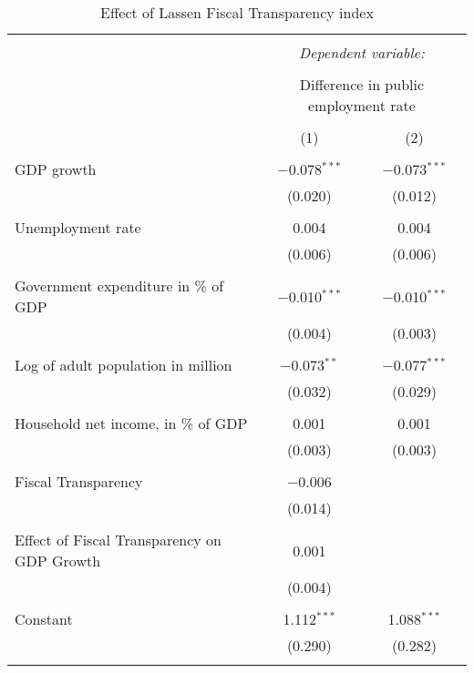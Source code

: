 
\begin{table}[!htbp] \centering 
  \caption{Effect of Lassen Fiscal Transparency index} 
  \label{} 
\begin{tabular}{@{\extracolsep{5pt}}lcc} 
\\[-1.8ex]\hline 
\hline \\[-1.8ex] 
 & \multicolumn{2}{c}{\textit{Dependent variable:}} \\ 
\cline{2-3} 
\\[-1.8ex] & \multicolumn{2}{c}{Difference in public employment rate} \\ 
\\[-1.8ex] & (1) & (2)\\ 
\hline \\[-1.8ex] 
 GDP growth & $-$0.078$^{***}$ & $-$0.073$^{***}$ \\ 
  & (0.020) & (0.012) \\ 
  & & \\ 
 Unemployment rate & 0.004 & 0.004 \\ 
  & (0.006) & (0.006) \\ 
  & & \\ 
 Government expenditure in \% of GDP & $-$0.010$^{***}$ & $-$0.010$^{***}$ \\ 
  & (0.004) & (0.003) \\ 
  & & \\ 
 Log of adult population in million & $-$0.073$^{**}$ & $-$0.077$^{***}$ \\ 
  & (0.032) & (0.029) \\ 
  & & \\ 
 Household net income, in \% of GDP & 0.001 & 0.001 \\ 
  & (0.003) & (0.003) \\ 
  & & \\ 
 Fiscal Transparency & $-$0.006 &  \\ 
  & (0.014) &  \\ 
  & & \\ 
 Effect of Fiscal Transparency on GDP Growth & 0.001 &  \\ 
  & (0.004) &  \\ 
  & & \\ 
 Constant & 1.112$^{***}$ & 1.088$^{***}$ \\ 
  & (0.290) & (0.282) \\ 
  & & \\ 

\end{tabular}
\end{table}
